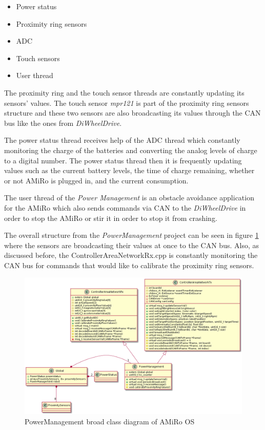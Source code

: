 \documentclass[12pt]{report}%
\begin{document}
\begin{itemize}
  \item Power status
	\item Proximity ring sensors
	\item ADC
	\item Touch sensors %
	\item User thread
\end{itemize}

The proximity ring and the touch sensor threads are constantly updating its sensors' values. The touch sensor \textit{mpr121} is part of the proximity ring sensors structure and these two sensors are also broadcasting its values through the CAN bus like the ones from \textit{DiWheelDrive}.

The power status thread receives help of the ADC thread which constantly monitoring the charge of the batteries and converting the analog levels of charge to a digital number. The power status thread then it is frequently updating values such as the current battery levels, the time of charge remaining, whether or not AMiRo is plugged in, and the current consumption.

The user thread of the \textit{Power Management} is an obstacle avoidance application for the AMiRo which also sends commands via CAN to the \textit{DiWheelDrive} in order to stop the AMiRo or stir it in order to stop it from crashing.

The overall structure from the \textit{PowerManagement} project can be seen in figure \ref{fig:PMclassOS} where the sensors are broadcasting their values at once to the CAN bus. Also, as discussed before, the ControllerAreaNetworkRx.cpp is constantly monitoring the CAN bus for commands that would like to calibrate the proximity ring sensors.

\begin{figure}[ht]
	\centering
	\includegraphics[width=\textwidth]{PMclass_OS}
    \caption{PowerManagement broad class diagram of AMiRo OS}
    \label{fig:PMclassOS}
\end{figure}
\end{document}

